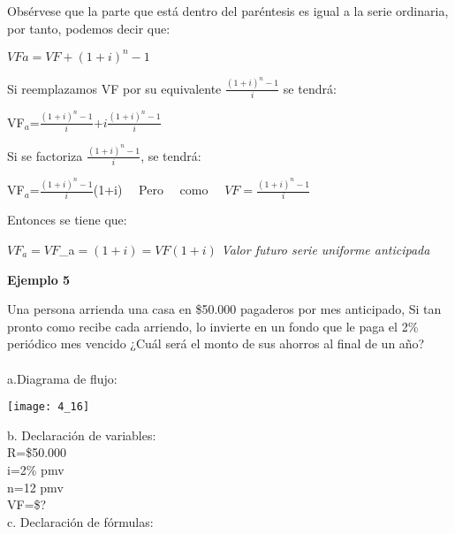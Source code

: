 {Obsérvese que la parte que está dentro del paréntesis es igual a la serie ordinaria, por tanto, podemos decir que:

\vspace{5mm}
        $VFa=VF+(1+i)^{n}-1$
\vspace{5mm}

Si reemplazamos VF por su equivalente $\frac{(1+i)^{n}-1}{i}$ se tendrá:

\vspace{5mm}
	VF$_{a}$=$\frac{(1+i)^{n}-1}{i}$+$i\frac{(1+i)^{n}-1}{i}$
\vspace{5mm}

Si se factoriza  $\frac{(1+i)^{n}-1}{i}$, se tendrá:

\vspace{5mm}
    VF$_{a}$=$\frac{(1+i)^{n}-1}{i}$(1+i) \ \  Pero \ \ como \ \ $VF = \frac{(1+i)^{n}-1}{i}$
\vspace{5mm}

Entonces se tiene que:

\vspace{5mm}
	$VF_{a} = VF$_{a}$=$$(1+i) = VF (1+i)$  \hspace{35}\textit{ Valor  futuro  serie  uniforme  anticipada}

\vspace{5mm}

\textbf{Ejemplo 5}

\vspace{5mm}

Una persona arrienda una casa en \$50.000 pagaderos por mes anticipado, Si tan pronto como recibe cada arriendo, lo invierte en un fondo que le paga el 2\% periódico mes vencido ¿Cuál será el monto de sus ahorros al final de un año? 
\\\\
a.Diagrama de flujo:\\

\begin{center}
	\texttt{[image: 4\_16]}
\end{center}

\clearpage

b. Declaración de variables: \\

	R=\$50.000  \\ 
	i=2\%  pmv \\
	n=12  pmv\\
	VF=\$?\\


c. Declaración de fórmulas:\\

}
